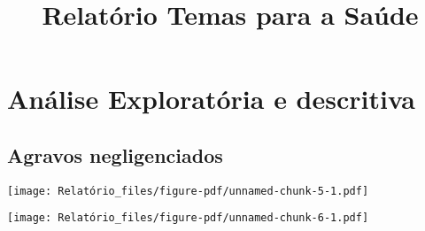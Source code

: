 \documentclass[
  letterpaper,
  DIV=11,
  numbers=noendperiod]{scrartcl}
\title{Relatório Temas para a Saúde}
\author{}
\date{}
\begin{document}
\maketitle


\section{Análise Exploratória e
descritiva}\label{anuxe1lise-exploratuxf3ria-e-descritiva}

\subsection{Agravos negligenciados}\label{agravos-negligenciados}

\texttt{[image: Relatório\_files/figure-pdf/unnamed-chunk-5-1.pdf]}

\texttt{[image: Relatório\_files/figure-pdf/unnamed-chunk-6-1.pdf]}
\end{document}
